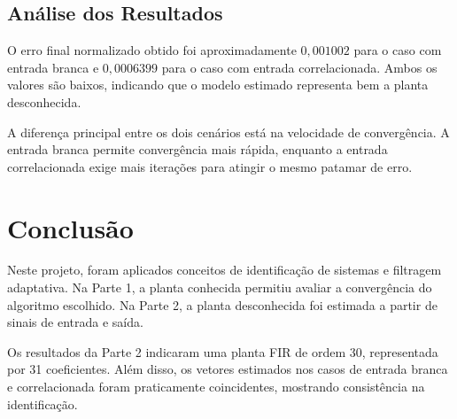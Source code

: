 \documentclass[12pt,a4paper]{article}
\begin{document}
\subsection{Análise dos Resultados}

O erro final normalizado obtido foi aproximadamente $0{,}001002$ para o caso com entrada branca e $0{,}0006399$ para o caso com entrada correlacionada. Ambos os valores são baixos, indicando que o modelo estimado representa bem a planta desconhecida.

A diferença principal entre os dois cenários está na velocidade de convergência. A entrada branca permite convergência mais rápida, enquanto a entrada correlacionada exige mais iterações para atingir o mesmo patamar de erro.

\section{Conclusão}

Neste projeto, foram aplicados conceitos de identificação de sistemas e filtragem adaptativa. Na Parte 1, a planta conhecida permitiu avaliar a convergência do algoritmo escolhido. Na Parte 2, a planta desconhecida foi estimada a partir de sinais de entrada e saída.

Os resultados da Parte 2 indicaram uma planta FIR de ordem 30, representada por 31 coeficientes. Além disso, os vetores estimados nos casos de entrada branca e correlacionada foram praticamente coincidentes, mostrando consistência na identificação.
\end{document}

